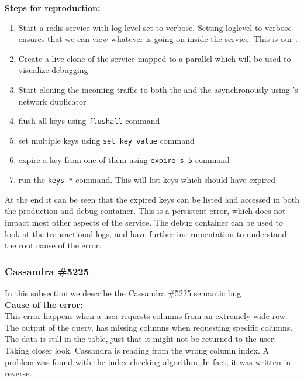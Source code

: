 \noindent \textbf{Steps for reproduction:} \\

\begin{adjustwidth}{0.5cm}{}
	\begin{enumerate}
			\item Start a redis service with log level set to verbose. Setting loglevel to verbose ensures that we can view whatever is going on inside the service. This is our \productioncontainer.
			\item Create a live clone of the service mapped to a parallel \debugcontainer which will be used to visualize debugging
			\item Start cloning the incoming traffic to both the \productioncontainer and the \debugcontainer asynchronously using \parikshan's network duplicator
			\item flush all keys using \texttt{flushall} command 
			\item set multiple keys using \texttt{set key value} command 
			\item expire a key from one of them using \texttt{expire s 5} command
			\item run the \texttt{keys *} command. This will list keys which should have expired
	\end{enumerate}

\end{adjustwidth}


At the end it can be seen that the expired keys can be listed and accessed in both the production and debug container. This is a persistent error, which does not impact most other aspects of the service. The debug container can be used to look at the transactional logs, and have further instrumentation to understand the root cause of the error.

\subsubsection{Cassandra \#5225}

In this subsection we describe the Cassandra \#5225 semantic bug \\

\noindent \textbf{Cause of the error:} \\

This error happens when a user requests columns from an extremely wide row.
The output of the query, has missing columns when requesting specific columns. 
The data is still in the table, just that it might not be returned to the user. 
Taking closer look, Cassandra is reading from the wrong column index. 
A problem was found with the index checking algorithm. In fact, it was written in reverse.\\

